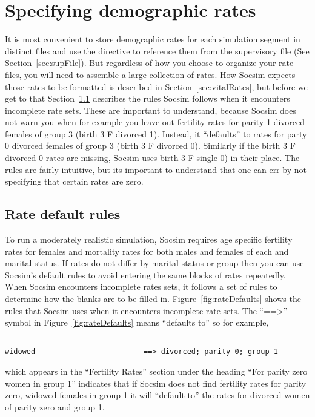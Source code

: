 
\section{Specifying demographic rates}
\label{sec:rateFiles}

It is most convenient to store demographic rates for each simulation
segment in distinct files and use the  directive to
reference them from the supervisory file (See
Section~\ref{sec:supFile}).  But regardless of how you choose to organize your rate files,  you will need to assemble a large collection of rates. How Socsim expects those rates to be formatted is described in Section~\ref{sec:vitalRates}, but before we get to that Section~\ref{sec:rateDefault} describes the rules Socsim follows when it encounters incomplete rate sets.  These are important to understand, because Socsim does not warn you when for example you leave out fertility rates for parity 1 divorced females of group 3  (birth 3 F divorced 1).  Instead, it ``defaults'' to rates for party 0 divorced females of group 3 (birth 3 F divorced 0). Similarly if the birth 3 F divorced 0 rates are missing, Socsim uses birth 3 F single 0) in their place.  The rules are fairly intuitive, but its important to understand that one can err by not specifying that certain rates are zero.  

\subsection{Rate default rules}
\label{sec:rateDefault}


To run a moderately realistic simulation, Socsim requires age specific
fertility rates for females and mortality rates for both males and
females of each  and marital status.  If rates do not
differ by marital status or group then you can use Socsim's default
rules to avoid entering the same blocks of rates repeatedly.  When Socsim
encounters incomplete rates sets, it follows a set of rules to determine how the blanks are to be filled in.
Figure~\ref{fig:rateDefaults} shows the rules that Socsim uses when it
encounters incomplete rate sets. The ``==>'' symbol in
Figure~\ref{fig:rateDefaults} means ``defaults to'' so for example,
\begin{verbatim}

widowed                         ==> divorced; parity 0; group 1

\end{verbatim}
which appears in the ``Fertility Rates'' section under the heading
``For parity zero women in group 1'' 
indicates that if Socsim does not find fertility rates for parity zero, widowed
females in group 1 it will ``default to'' the rates for divorced women of parity zero and group 1.


